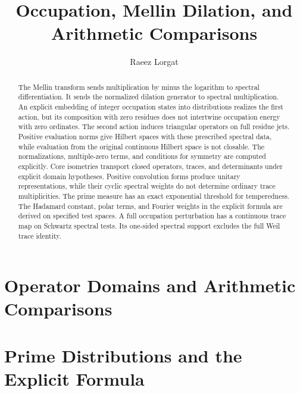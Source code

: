 \documentclass[11pt]{memoir}
\title{Occupation, Mellin Dilation, and Arithmetic Comparisons}
\author{Raeez Lorgat}
\date{}
\begin{document}
\maketitle
\begin{abstract}
The Mellin transform sends multiplication by minus the logarithm to
spectral differentiation. It sends the normalized dilation generator
to spectral multiplication. An explicit embedding of integer
occupation states into distributions realizes the first action, but
its composition with zero residues does not intertwine occupation
energy with zero ordinates. The second action induces triangular
operators on full residue jets. Positive evaluation norms give
Hilbert spaces with these prescribed spectral data, while evaluation
from the original continuous Hilbert space is not closable. The
normalizations, multiple-zero terms, and conditions for symmetry are
computed explicitly.
Core isometries transport closed operators, traces, and determinants
under explicit domain hypotheses. Positive convolution forms produce
unitary representations, while their cyclic spectral weights do not
determine ordinary trace multiplicities.
The prime measure has an exact exponential threshold for temperedness.
The Hadamard constant, polar terms, and Fourier weights in the explicit
formula are derived on specified test spaces. A full occupation
perturbation has a continuous trace map on Schwartz spectral tests.
Its one-sided spectral support excludes the full Weil trace identity.
\end{abstract}


\chapter{Operator Domains and Arithmetic Comparisons}


\chapter{Prime Distributions and the Explicit Formula}











\end{document}

